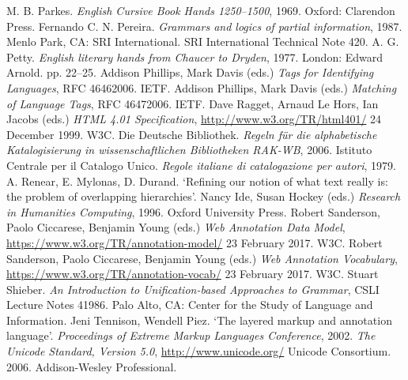 \begin{bibitemlist}{1}
\label{PARKES}M. B. Parkes. \textit{English Cursive Book Hands 1250–1500}, 1969. Oxford: Clarendon Press. 
\label{FS-BIBL-1}Fernando C. N. Pereira. \textit{Grammars and logics of partial information}, 1987. Menlo Park, CA: SRI International. SRI International Technical Note  420. 
\label{PETTY}A. G. Petty. \textit{English literary hands from Chaucer to Dryden}, 1977. London: Edward Arnold. pp. 22–25. 
\label{CH-BIBL-4}Addison Phillips, Mark Davis (eds.) \textit{Tags for Identifying Languages},  RFC 46462006. IETF. 
\label{CH-BIBL-5}Addison Phillips, Mark Davis (eds.) \textit{Matching of Language Tags},  RFC 46472006. IETF. 
\label{HTML4}Dave Ragget, Arnaud Le Hors, Ian Jacobs (eds.) \textit{HTML 4.01 Specification},  \url{http://www.w3.org/TR/html401/} 24 December 1999. W3C. 
\label{RAK}Die Deutsche Bibliothek. \textit{Regeln für die alphabetische Katalogisierung in wissenschaftlichen Bibliotheken RAK-WB}, 2006. 
\label{RICA}Istituto Centrale per il Catalogo Unico. \textit{Regole italiane di catalogazione per autori}, 1979. 
\label{SG-BIBL-2}A. Renear, E. Mylonas, D.  Durand. ‘Refining our notion of what text really is: the problem of overlapping hierarchies’. Nancy Ide, Susan Hockey (eds.) \textit{Research in Humanities Computing}, 1996. Oxford University Press. 
\label{WADM}Robert Sanderson, Paolo Ciccarese, Benjamin Young (eds.) \textit{Web Annotation Data Model},  \url{https://www.w3.org/TR/annotation-model/} 23 February 2017. W3C. 
\label{WAV}Robert Sanderson, Paolo Ciccarese, Benjamin Young (eds.) \textit{Web Annotation Vocabulary},  \url{https://www.w3.org/TR/annotation-vocab/} 23 February 2017. W3C. 
\label{FS-BIBL-2}Stuart Shieber. \textit{An Introduction to Unification-based Approaches to Grammar},  CSLI Lecture Notes 41986. Palo Alto, CA: Center for the Study of Language and Information. 
\label{NH-BIBL-7}Jeni Tennison, Wendell Piez. ‘The layered markup and annotation language’. \textit{Proceedings of Extreme Markup Languages Conference}, 2002. 
\label{CH-BIBL-3}\textit{The Unicode Standard, Version 5.0},  \url{http://www.unicode.org/} Unicode Consortium. 2006. Addison-Wesley Professional. 

\end{bibitemlist}
